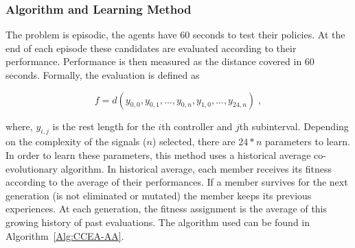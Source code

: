
\subsubsection{Algorithm and Learning Method}
The problem is episodic, the agents have 60 seconds to test their policies. At the end of each episode these candidates are evaluated according to their performance. 
Performance is then measured as the distance covered in 60 seconds. 
Formally, the evaluation is defined as

\begin{equation}
\label{eq:r}
f = d(y_{0,0},y_{0,1},...,y_{0,n},y_{1,0},...,y_{24,n}) \;,
\end{equation}

where, $y_{i,j}$ is the rest length for the $i$th controller and $j$th subinterval. 
Depending on the complexity of the signals ($n$) selected, there are $24 * n$ parameters to learn. 
In order to learn these parameters, this method uses a historical average co-evolutionary algorithm.
In historical average, each member receives its fitness according to the average of their performances.
If a member survives for the next generation (is not eliminated or mutated) the member keeps  its previous experiences. 
At each generation, the fitness assignment is the average of this growing history of past evaluations. 
The algorithm used can be found in Algorithm~\ref{Alg:CCEA-AA}.



